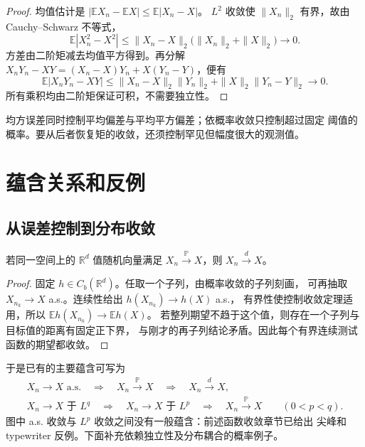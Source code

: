 \begin{proof}
均值估计是
$|\mathbb E X_n-\mathbb E X|\le\mathbb E|X_n-X|$。
$L^2$ 收敛使 $\|X_n\|_2$ 有界，故由 Cauchy--Schwarz 不等式，
\[
 \mathbb E|X_n^2-X^2|
 \le\|X_n-X\|_2\bigl(\|X_n\|_2+\|X\|_2\bigr)\longrightarrow0.
\]
方差由二阶矩减去均值平方得到。再分解
$X_nY_n-XY=(X_n-X)Y_n+X(Y_n-Y)$，便有
\[
 \mathbb E|X_nY_n-XY|
 \le\|X_n-X\|_2\|Y_n\|_2+\|X\|_2\|Y_n-Y\|_2\longrightarrow0.
\]
所有乘积均由二阶矩保证可积，不需要独立性。
\end{proof}

均方误差同时控制平均偏差与平均平方偏差；依概率收敛只控制超过固定
阈值的概率。要从后者恢复矩的收敛，还须控制罕见但幅度很大的观测值。

\section{蕴含关系和反例}
\label{sec:probability-convergence-relations}

\subsection{从误差控制到分布收敛}

\begin{theorem}
\label{thm:probability-implies-distribution}
若同一空间上的 $\mathbb R^d$ 值随机向量满足
$X_n\xrightarrow{\mathbb P}X$，则 $X_n\xrightarrow dX$。
\end{theorem}

\begin{proof}
固定 $h\in C_b(\mathbb R^d)$。任取一个子列，由概率收敛的子列刻画，
可再抽取 $X_{n_k}\to X$ a.s.。连续性给出 $h(X_{n_k})\to h(X)$ a.s.，
有界性使控制收敛定理适用，所以
$\mathbb E h(X_{n_k})\to\mathbb E h(X)$。
若整列期望不趋于这个值，则存在一个子列与目标值的距离有固定正下界，
与刚才的再子列结论矛盾。因此每个有界连续测试函数的期望都收敛。
\end{proof}

于是已有的主要蕴含可写为
\[
 \begin{gathered}
 X_n\to X\text{ a.s.}\quad\Longrightarrow\quad
 X_n\xrightarrow{\mathbb P}X\quad\Longrightarrow\quad X_n\xrightarrow dX,\\
 X_n\to X\text{ 于 }L^q\quad\Longrightarrow\quad
 X_n\to X\text{ 于 }L^p\quad\Longrightarrow\quad
 X_n\xrightarrow{\mathbb P}X\qquad(0<p<q).
 \end{gathered}
\]
图中 a.s. 收敛与 $L^p$ 收敛之间没有一般蕴含：前述函数收敛章节已给出
尖峰和 typewriter 反例。下面补充依赖独立性及分布耦合的概率例子。

